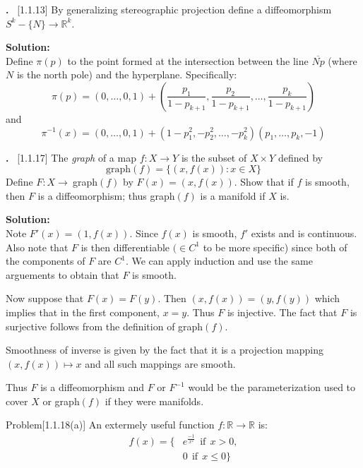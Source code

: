 \documentclass{article}
\newcounter{problem}
\newcounter{solution}
\newcommand\Problem{%
  \stepcounter{problem}%
  \textbf{\theproblem.}~%
  \setcounter{solution}{0}%
}
\newcommand\TheSolution{%
  \textbf{Solution:}\\%
}
\begin{document}
\Problem[1.1.13] By generalizing stereographic projection define a %
diffeomorphism $S^k - \{N\} \to \mathbb{R}^k$.

\TheSolution Define $\pi(p)$ to the point formed at the intersection %
between the line $\overline{Np}$ (where $N$ is the north pole) and %
the hyperplane. Specifically:
\[\pi(p) = (0,\hdots,0,1) + (\frac{p_1}{1-p_{k+1}},%
    \frac{p_2}{1-p_{k+1}},\hdots,\frac{p_k}{1-p_{k+1}})\]
and
\[\pi^{-1}(x) = (0,\hdots,0,1) + %
    (1-p_1^2,-p_2^2,\hdots,-p_k^2)(p_1,\hdots,p_k,-1)\]

\Problem[1.1.17] The \textit{graph} of a map $f:X\to Y$ is the %
subset of $X\times Y$ defined by
\[\text{graph}(f) = \{(x,f(x)): x\in X\}\]
Define $F:X\to\:$graph$(f)$ by $F(x)=(x,f(x))$. Show that if $f$ is %
smooth, then $F$ is a diffeomorphism; thus graph$(f)$ is a manifold %
if $X$ is.

\TheSolution Note $F'(x) = (1,f(x))$. Since $f(x)$ is smooth, $f'$ %
exists and is continuous. Also note that $F$ is then differentiable %
$(\in C^1$ to be more specific) since both of the components of $F$ %
are $C^1$. We can apply induction and use the same arguements to %
obtain that $F$ is smooth.

Now suppose that $F(x)=F(y)$. Then $(x,f(x))=(y,f(y))$ which implies %
that in the first component, $x=y$. Thus $F$ is injective. The fact %
that $F$ is surjective follows from the definition of graph$(f)$.

Smoothness of inverse is given by the fact that it is a projection %
mapping $(x,f(x))\mapsto x$ and all such mappings are smooth. 

Thus $F$ is a diffeomorphism and $F$ or $F^{-1}$ would be the %
parameterization used to cover $X$ or graph$(f)$ if they were %
manifolds.

Problem[1.1.18(a)] An extermely useful function %
$f:\mathbb{R}\to\mathbb{R}$ is:
\begin{align*}
    f(x) = \{ &e^{\frac{-1}{x^2}}\:\: \text{if}\:\: x>0,\\
            &0\:\: \text{if}\:\: x\leq0\}
\end{align*}
\end{document}
